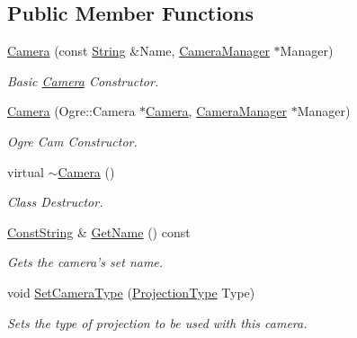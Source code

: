 \subsection*{Public Member Functions}
\begin{DoxyCompactItemize}
\item 
\hyperlink{classphys_1_1Camera_a863e7b7a0fb4db7969014d8391b5ca30}{Camera} (const \hyperlink{namespacephys_aa03900411993de7fbfec4789bc1d392e}{String} \&Name, \hyperlink{classphys_1_1CameraManager}{CameraManager} $\ast$Manager)
\begin{DoxyCompactList}\small\item\em Basic \hyperlink{classphys_1_1Camera}{Camera} Constructor. \item\end{DoxyCompactList}\item 
\hyperlink{classphys_1_1Camera_a0510d4f9bf6fb195115272cbd116e8dd}{Camera} (Ogre::Camera $\ast$\hyperlink{classphys_1_1Camera}{Camera}, \hyperlink{classphys_1_1CameraManager}{CameraManager} $\ast$Manager)
\begin{DoxyCompactList}\small\item\em Ogre Cam Constructor. \item\end{DoxyCompactList}\item 
virtual \hyperlink{classphys_1_1Camera_aa45f340a6f7ba0970aa2602a928463ea}{$\sim$Camera} ()
\begin{DoxyCompactList}\small\item\em Class Destructor. \item\end{DoxyCompactList}\item 
\hyperlink{namespacephys_a5ce5049f8b4bf88d6413c47b504ebb31}{ConstString} \& \hyperlink{classphys_1_1Camera_ae24490b8589796cb5f51d291cc418d84}{GetName} () const 
\begin{DoxyCompactList}\small\item\em Gets the camera's set name. \item\end{DoxyCompactList}\item 
void \hyperlink{classphys_1_1Camera_ac3a8ffec5fa70fa4981fc25815fdc8a3}{SetCameraType} (\hyperlink{classphys_1_1Camera_a87d8d46e9eb2080b10712079be69d86a}{ProjectionType} Type)
\begin{DoxyCompactList}\small\item\em Sets the type of projection to be used with this camera. \item\end{DoxyCompactList}\item 

\end{DoxyCompactItemize}
